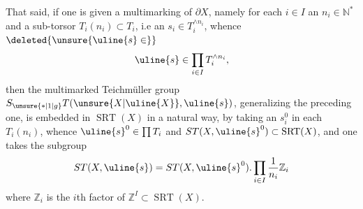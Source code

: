 
That said, if one is given a
multimarking of $\partial X$, namely for
each $i\in I$ an $n_i\in\mathbb N^*$ and a
sub-torsor
$T_i(n_i)\subset T_i$,
 i.e
an $s_i\in T_i^{\wedge n_i}$, whence
$\deleted{\unsure{\uline{s}\in}}$
\[
\uline{s}\in\prod_{i\in I}T_i^{\wedge n_i},
\]
then the multimarked Teichmüller group
$S_{\unsure{*|1|g}}T(\unsure{X|\uline{X}},\uline{s})$,
generalizing the preceding one, is
embedded in $\operatorname{SRT}(X)$ in a natural way,
by taking an $s_i^0$ in each $T_i(n_i)$, whence
$\uline{s}^0\in\prod T_i$ and
$ST(X,\uline{s}^0)\subset\operatorname{SRT}(X)$,
and one takes the subgroup
\[
ST(X,\uline{s})=ST(X,\uline{s}^0).
\prod_{i\in I}\frac1{n_i}\mathbb Z_i
\]
where $\mathbb Z_i$ is the $i$th factor of
$\mathbb Z^I\subset\operatorname{SRT}(X)$.

